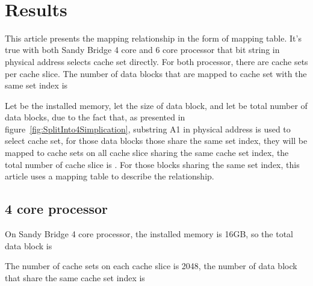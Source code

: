 \documentclass[conference]{IEEEtran}
\newcommand{\WordDataBlock}{data block }
\newcommand{\SandyBridge}{Sandy Bridge }
\begin{document}
\begin{figure*}[!htbp]
\centering
{}
	~
	\caption{This article uses connected subgraph method to solve the problem of classifying \WordDataBlock.}
\end{figure*}
\section{Results}
This article presents the mapping relationship in the form of mapping table. It's true with both \SandyBridge 4 core and 6 core processor that bit string  in physical address selects cache set directly.
For both processor, there are  cache sets per cache slice. The number of data blocks that are mapped to cache set with the same set index is  

Let  be the installed memory, let  the size of data block, and let  be total number of data blocks, due to the fact that, as presented in figure~\ref{fig:SplitInto4Simplication}, substring A1 in physical address is used to select cache set, for those data blocks those share the same set index, they will be mapped to cache sets on all cache slice sharing the same cache set index, the total number of cache slice is . For those blocks sharing the same set index, this article uses a mapping table to describe the relationship.
\subsection{4 core processor}
On \SandyBridge 4 core processor, the installed memory is 16GB, so the total data block is 

The number of cache sets on each cache slice is 2048, the number of data block that share the same cache set index is 
\end{document}
